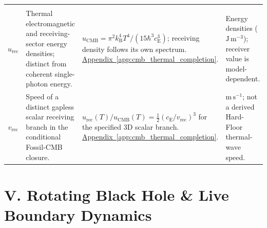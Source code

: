 \begin{longtable}{@{} c p{5.5cm} p{4cm} p{3.5cm} @{}}
\begin{tabular}[c]{@{}c@{}}$u_{\mathrm{CMB}}$ \\ $u_{\mathrm{rec}}$\end{tabular} & {\raggedright Thermal electromagnetic and receiving-sector energy densities; distinct from coherent single-photon energy.\par} & {\raggedright $u_{\mathrm{CMB}}=\pi^2k_{\mathrm B}^4T^4/(15\hbar^3c_{\mathrm E}^3)$; receiving density follows its own spectrum. \newline \hyperref[app:cmb_thermal_completion]{Appendix~\ref*{app:cmb_thermal_completion}}.\par} & {\raggedright Energy densities ($\mathrm{J\,m^{-3}}$); receiver value is model-dependent.\par} \\

$v_{\mathrm{rec}}$ & {\raggedright Speed of a distinct gapless scalar receiving branch in the conditional Fossil-CMB closure.\par} & {\raggedright $u_{\mathrm{rec}}(T)/u_{\mathrm{CMB}}(T)=\tfrac12(c_{\mathrm E}/v_{\mathrm{rec}})^3$ for the specified 3D scalar branch. \newline \hyperref[app:cmb_thermal_completion]{Appendix~\ref*{app:cmb_thermal_completion}}.\par} & {\raggedright $\mathrm{m\,s^{-1}}$; not a derived Hard-Floor thermal-wave speed.\par} \\


\bottomrule
\end{longtable}

\newpage %

\section*{V. Rotating Black Hole \& Live Boundary Dynamics}

